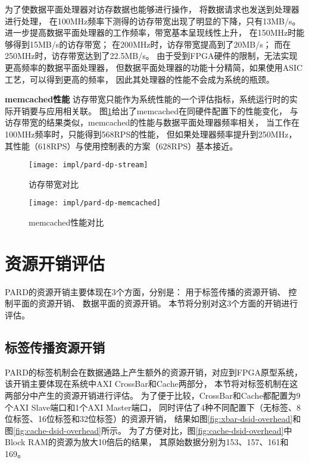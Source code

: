 为了使数据平面处理器对访存数据也能够进行操作，
将数据请求也发送到处理器进行处理，
在100MHz频率下测得的访存带宽出现了明显的下降，只有13MB/s。
进一步提高数据平面处理器的工作频率，带宽基本呈现线性上升，
在150MHz时能够得到15MB/s的访存带宽；
在200MHz时，访存带宽提高到了20MB/s；
而在250MHz时，访存带宽达到了22.5MB/s。
由于受到FPGA硬件的限制，无法实现更高频率的数据平面处理器，
但数据平面处理器的功能十分精简，如果使用ASIC工艺，可以得到更高的频率，
因此其处理器的性能不会成为系统的瓶颈。

\textbf{memcached性能}\quad
访存带宽只能作为系统性能的一个评估指标，系统运行时的实际开销要与应用相关联。
图\ref{fig:pard-dp-memcached}给出了memcached在同硬件配置下的性能变化，
与访存带宽的结果类似，memcached的性能与数据平面处理器频率相关，
当工作在100MHz频率时，只能得到568RPS的性能，
但如果处理器频率提升到250MHz，其性能（618RPS）与使用控制表的方案（628RPS）基本接近。

\begin{figure}[tb]
\begin{minipage}{0.48\textwidth}
  \centering
  \texttt{[image: impl/pard-dp-stream]}
  \caption{访存带宽对比}
  \label{fig:pard-dp-stream}
\end{minipage}\hfill
\begin{minipage}{0.48\textwidth}
  \centering
  \texttt{[image: impl/pard-dp-memcached]}
  \caption{memcached性能对比}
  \label{fig:pard-dp-memcached}
\end{minipage}
\end{figure}


\section{资源开销评估}

PARD的资源开销主要体现在3个方面，分别是：
用于标签传播的资源开销、
控制平面的资源开销、
数据平面的资源开销。
本节将分别对这3个方面的开销进行评估。

\subsection{标签传播资源开销}

PARD的标签机制会在数据通路上产生额外的资源开销，对应到FPGA原型系统，
该开销主要体现在系统中AXI CrossBar和Cache两部分，
本节将对标签机制在这两部分中产生的资源开销进行评估。
为了便于比较，CrossBar和Cache都配置为9个AXI Slave端口和1个AXI Master端口，
同时评估了4种不同配置下（无标签、8位标签、16位标签和32位标签）的资源开销，
结果如图\ref{fig:xbar-dsid-overhead}和图\ref{fig:cache-dsid-overhead}所示。
为了方便对比，图\ref{fig:cache-dsid-overhead}中Block RAM的资源为放大10倍后的结果，
其原始数据分别为153、157、161和169。

